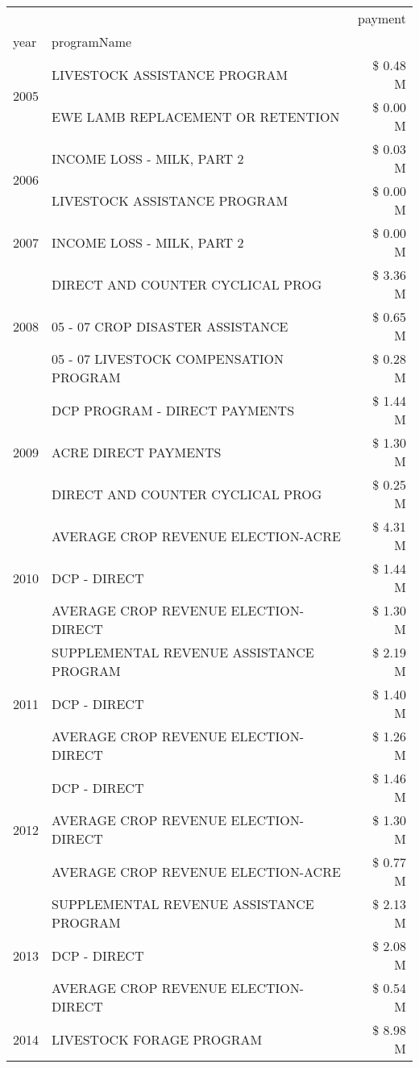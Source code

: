 \begin{tabular}{llr}
\toprule
 &  & payment \\
year & programName &  \\
\midrule
\multirow[t]{2}{*}{2005} & LIVESTOCK ASSISTANCE PROGRAM & \$ 0.48 M \\
 & EWE LAMB REPLACEMENT OR RETENTION & \$ 0.00 M \\
\cline{1-3}
\multirow[t]{2}{*}{2006} & INCOME LOSS - MILK, PART 2 & \$ 0.03 M \\
 & LIVESTOCK ASSISTANCE PROGRAM & \$ 0.00 M \\
\cline{1-3}
2007 & INCOME LOSS - MILK, PART 2 & \$ 0.00 M \\
\cline{1-3}
\multirow[t]{3}{*}{2008} & DIRECT AND COUNTER CYCLICAL PROG & \$ 3.36 M \\
 & 05 - 07 CROP DISASTER ASSISTANCE & \$ 0.65 M \\
 & 05 - 07 LIVESTOCK COMPENSATION PROGRAM & \$ 0.28 M \\
\cline{1-3}
\multirow[t]{3}{*}{2009} & DCP PROGRAM - DIRECT PAYMENTS & \$ 1.44 M \\
 & ACRE DIRECT PAYMENTS & \$ 1.30 M \\
 & DIRECT AND COUNTER CYCLICAL PROG & \$ 0.25 M \\
\cline{1-3}
\multirow[t]{3}{*}{2010} & AVERAGE CROP REVENUE ELECTION-ACRE & \$ 4.31 M \\
 & DCP - DIRECT & \$ 1.44 M \\
 & AVERAGE CROP REVENUE ELECTION-DIRECT & \$ 1.30 M \\
\cline{1-3}
\multirow[t]{3}{*}{2011} & SUPPLEMENTAL REVENUE ASSISTANCE PROGRAM & \$ 2.19 M \\
 & DCP - DIRECT & \$ 1.40 M \\
 & AVERAGE CROP REVENUE ELECTION-DIRECT & \$ 1.26 M \\
\cline{1-3}
\multirow[t]{3}{*}{2012} & DCP - DIRECT & \$ 1.46 M \\
 & AVERAGE CROP REVENUE ELECTION-DIRECT & \$ 1.30 M \\
 & AVERAGE CROP REVENUE ELECTION-ACRE & \$ 0.77 M \\
\cline{1-3}
\multirow[t]{3}{*}{2013} & SUPPLEMENTAL REVENUE ASSISTANCE PROGRAM & \$ 2.13 M \\
 & DCP - DIRECT & \$ 2.08 M \\
 & AVERAGE CROP REVENUE ELECTION-DIRECT & \$ 0.54 M \\
\cline{1-3}
\multirow[t]{3}{*}{2014} & LIVESTOCK FORAGE PROGRAM & \$ 8.98 M \\

\end{tabular}

